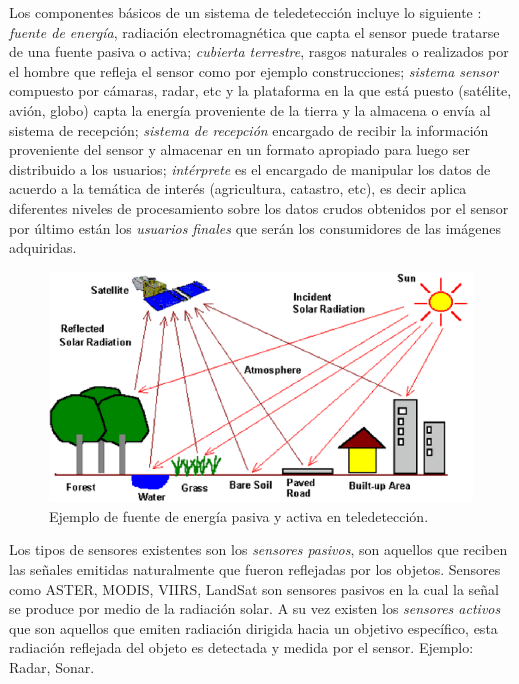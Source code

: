 Los componentes básicos de un sistema de teledetección incluye lo siguiente \citep{chuvieco}: \textit{fuente de energía},  radiación electromagnética que capta el sensor puede tratarse de una fuente pasiva o activa; \textit{cubierta terrestre}, rasgos naturales o 
realizados por el hombre que refleja el sensor como por ejemplo construcciones; \textit{sistema sensor} compuesto por cámaras, radar, etc  y la plataforma en la que está puesto (satélite, avión, globo) capta la energía proveniente de la tierra y la almacena o envía al sistema de recepción; \textit{sistema de recepción} encargado de recibir la información proveniente del sensor y almacenar en un formato apropiado para luego ser distribuido a los usuarios; \textit{intérprete} es el encargado de manipular los datos de acuerdo a la temática de interés (agricultura, catastro, etc), es decir aplica diferentes niveles de procesamiento sobre los datos crudos obtenidos por el sensor por último están los \textit{usuarios finales} que serán los consumidores de las imágenes adquiridas.

\begin{figure}[H] \centering
  \includegraphics[scale=0.35, keepaspectratio=true,clip=true]{imagenes/MarcoTeorico/teledeteccion.png}
  \caption{Ejemplo de fuente de energía pasiva y activa en teledetección.}\label{Fig:teledeteccion}
\end{figure}

Los tipos de sensores existentes son los  \textit{sensores pasivos}, son aquellos que reciben las señales emitidas naturalmente que fueron reflejadas por los objetos. Sensores como ASTER, MODIS, VIIRS, LandSat son sensores pasivos en la cual la señal se produce por medio de la radiación solar. A su vez existen los \textit{sensores activos} que son aquellos que emiten radiación dirigida hacia un objetivo específico, esta radiación reflejada del objeto es detectada y medida por el sensor. Ejemplo: Radar, Sonar.

